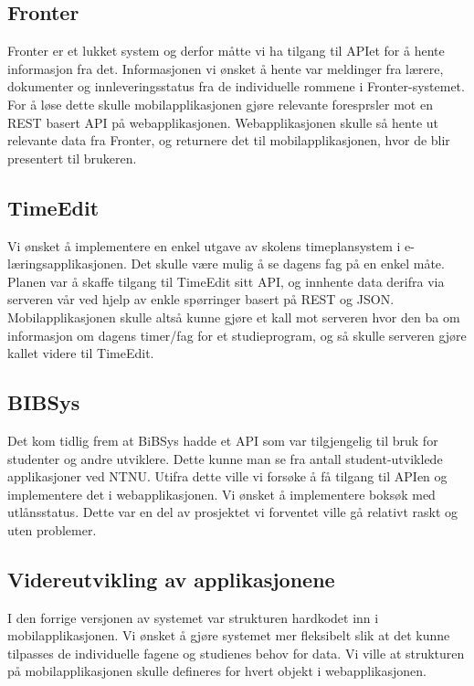 \documentclass[../main.tex]{subfiles}
\begin{document}
\subsection{Fronter}
Fronter er et lukket system og derfor måtte vi ha tilgang til APIet for å hente informasjon fra det. Informasjonen vi ønsket å hente var meldinger fra lærere, dokumenter og innleveringsstatus fra de individuelle rommene i Fronter-systemet. For å løse dette skulle mobilapplikasjonen gjøre relevante foresprsler mot en REST basert API på webapplikasjonen. Webapplikasjonen skulle så hente ut relevante data fra Fronter, og returnere det til mobilapplikasjonen, hvor de blir presentert til brukeren.
\subsection{TimeEdit}
Vi ønsket å implementere en enkel utgave av skolens timeplansystem i e-læringsapplikasjonen. Det skulle være mulig å se dagens fag på en enkel måte. Planen var å skaffe tilgang til TimeEdit sitt API, og innhente data derifra via serveren vår ved hjelp av enkle spørringer basert på REST og JSON. Mobilapplikasjonen skulle altså kunne gjøre et kall mot serveren hvor den ba om informasjon om dagens timer/fag for et studieprogram, og så skulle serveren gjøre kallet videre til TimeEdit.
\subsection{BIBSys}
Det kom tidlig frem at BiBSys hadde et API som var tilgjengelig til bruk for studenter og andre utviklere. Dette kunne man se fra antall student-utviklede applikasjoner ved NTNU. Utifra dette ville vi forsøke å få tilgang til APIen og implementere det i webapplikasjonen. Vi ønsket å implementere boksøk med utlånsstatus. Dette var en del av prosjektet vi forventet ville gå relativt raskt og uten problemer.

\subsection{Videreutvikling av applikasjonene}
I den forrige versjonen av systemet var strukturen hardkodet inn i mobilapplikasjonen. Vi ønsket å gjøre systemet mer fleksibelt slik at det kunne tilpasses de individuelle fagene og studienes behov for data. Vi ville at strukturen på mobilapplikasjonen skulle defineres for hvert objekt i webapplikasjonen.
\end{document}
